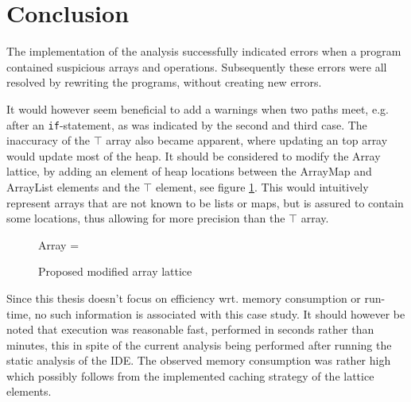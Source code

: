 \newpage\section{Conclusion}
\label{sec:caseConcl}
The implementation of the analysis successfully indicated errors when a program contained suspicious arrays and operations. Subsequently these errors were all resolved by rewriting the programs, without creating new errors. 

It would however seem beneficial to add a warnings when two paths meet, e.g. after an \texttt{if}-statement, as was indicated by the second and third case. The inaccuracy of the $\top$ array also became apparent, where updating an top array would update most of the heap. It should be considered to modify the Array lattice, by adding an element of heap locations between the ArrayMap and ArrayList elements and the $\top$ element, see figure \ref{fig:newArray}. This would intuitively represent arrays that are not known to be lists or maps, but is assured to contain some locations, thus allowing for more precision than the $\top$ array. 

\begin{figure}
\centering
Array = 
\caption{Proposed modified array lattice}
\label{fig:newArray}
\end{figure}

Since this thesis doesn't focus on efficiency wrt. memory consumption or run-time, no such information is associated with this case study. It should however be noted that execution was reasonable fast, performed in seconds rather than minutes, this in spite of the current analysis being performed after running the static analysis of the IDE. The observed memory consumption was rather high which possibly follows from the implemented caching strategy of the lattice elements.  
